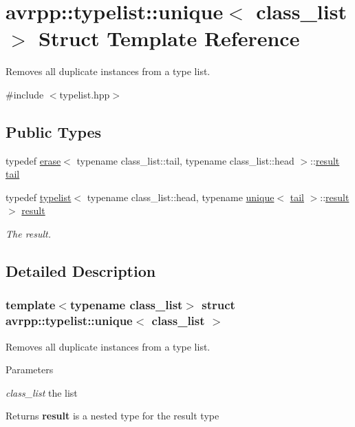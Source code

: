 \hypertarget{structavrpp_1_1typelist_1_1unique}{
\section{avrpp::typelist::unique$<$ class\_\-list $>$ Struct Template Reference}
\label{structavrpp_1_1typelist_1_1unique}
}


Removes all duplicate instances from a type list.  




{\ttfamily \#include $<$typelist.hpp$>$}

\subsection*{Public Types}
\begin{DoxyCompactItemize}
\item 
typedef \hyperlink{structavrpp_1_1typelist_1_1erase}{erase}$<$ typename class\_\-list::tail, typename class\_\-list::head $>$::\hyperlink{structavrpp_1_1typelist_1_1typelist}{result} \hyperlink{structavrpp_1_1typelist_1_1unique_a4868ed50111f93853eed0321df7395ec}{tail}
\item 
typedef \hyperlink{structavrpp_1_1typelist_1_1typelist}{typelist}$<$ typename class\_\-list::head, typename \hyperlink{structavrpp_1_1typelist_1_1unique}{unique}$<$ \hyperlink{structavrpp_1_1typelist_1_1typelist}{tail} $>$::\hyperlink{structavrpp_1_1typelist_1_1typelist}{result} $>$ \hyperlink{structavrpp_1_1typelist_1_1unique_a97c55b4f6702dc3b0997cf84b767fcb5}{result}
\begin{DoxyCompactList}\small\item\em The result. \item\end{DoxyCompactList}\end{DoxyCompactItemize}


\subsection{Detailed Description}
\subsubsection*{template$<$typename class\_\-list$>$ struct avrpp::typelist::unique$<$ class\_\-list $>$}

Removes all duplicate instances from a type list. 
\begin{DoxyParams}{Parameters}
\item[{\em class\_\-list}]the list \end{DoxyParams}
\begin{DoxyReturn}{Returns}
{\bfseries result} is a nested type for the result type 
\end{DoxyReturn}


